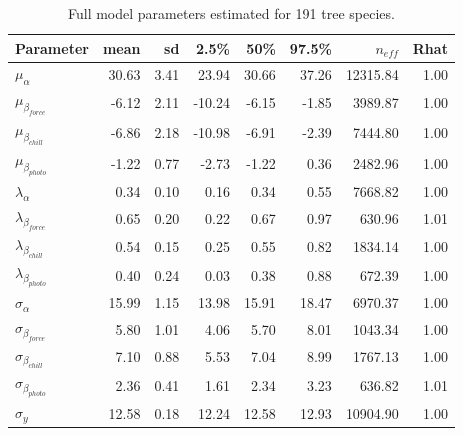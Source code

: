 \documentclass[11pt]{article}
\begin{document}
\begin{table}[ht]
\centering
\caption{Full model parameters estimated for 191 tree species.} 
\label{tab:modelanglamb}
\begingroup\footnotesize
\begin{tabular}{lrrrrrrr}
  \hline
Parameter & mean & sd & 2.5\% & 50\% & 97.5\% & $n_{eff}$ & Rhat \\ 
  \hline
$\mu_{\alpha}$ & 30.63 & 3.41 & 23.94 & 30.66 & 37.26 & 12315.84 & 1.00 \\ 
  $\mu_{\beta_{force}}$ & -6.12 & 2.11 & -10.24 & -6.15 & -1.85 & 3989.87 & 1.00 \\ 
  $\mu_{\beta_{chill}}$ & -6.86 & 2.18 & -10.98 & -6.91 & -2.39 & 7444.80 & 1.00 \\ 
  $\mu_{\beta_{photo}}$ & -1.22 & 0.77 & -2.73 & -1.22 & 0.36 & 2482.96 & 1.00 \\ 
  $\lambda_{\alpha}$ & 0.34 & 0.10 & 0.16 & 0.34 & 0.55 & 7668.82 & 1.00 \\ 
  $\lambda_{\beta_{force}}$ & 0.65 & 0.20 & 0.22 & 0.67 & 0.97 & 630.96 & 1.01 \\ 
  $\lambda_{\beta_{chill}}$ & 0.54 & 0.15 & 0.25 & 0.55 & 0.82 & 1834.14 & 1.00 \\ 
  $\lambda_{\beta_{photo}}$ & 0.40 & 0.24 & 0.03 & 0.38 & 0.88 & 672.39 & 1.00 \\ 
  $\sigma_{\alpha}$ & 15.99 & 1.15 & 13.98 & 15.91 & 18.47 & 6970.37 & 1.00 \\ 
  $\sigma_{\beta_{force}}$ & 5.80 & 1.01 & 4.06 & 5.70 & 8.01 & 1043.34 & 1.00 \\ 
  $\sigma_{\beta_{chill}}$ & 7.10 & 0.88 & 5.53 & 7.04 & 8.99 & 1767.13 & 1.00 \\ 
  $\sigma_{\beta_{photo}}$ & 2.36 & 0.41 & 1.61 & 2.34 & 3.23 & 636.82 & 1.01 \\ 
  $\sigma_y$ & 12.58 & 0.18 & 12.24 & 12.58 & 12.93 & 10904.90 & 1.00 \\ 
   \hline
\end{tabular}
\endgroup
\end{table} \clearpage \pagebreak 
\end{document}
